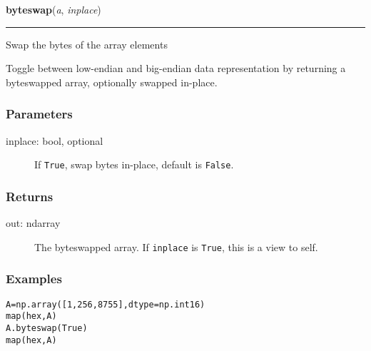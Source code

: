     \begin{boxedminipage}{\textwidth}

    \raggedright \textbf{byteswap}(\textit{a}, \textit{inplace})

    \vspace{-1.5ex}

    \rule{\textwidth}{0.5\fboxrule}

Swap the bytes of the array elements

Toggle between low-endian and big-endian data representation by
returning a byteswapped array, optionally swapped in-place.



\hypertarget{parameters}{}
\subsubsection*{Parameters}
\begin{description}
\item[{inplace: bool, optional}] %

If \texttt{True}, swap bytes in-place, default is \texttt{False}.

\end{description}



\hypertarget{returns}{}
\subsubsection*{Returns}
\begin{description}
\item[{out: ndarray}] %

The byteswapped array. If \texttt{inplace} is \texttt{True}, this is
a view to self.

\end{description}



\hypertarget{examples}{}
\subsubsection*{Examples}
\begin{alltt}
\pysrcprompt{{\textgreater}{\textgreater}{\textgreater} }A = np.array([1, 256, 8755], dtype=np.int16)
\pysrcprompt{{\textgreater}{\textgreater}{\textgreater} }map(hex, A)
\pysrcoutput{['0x1', '0x100', '0x2233']}
\pysrcoutput{}\pysrcprompt{{\textgreater}{\textgreater}{\textgreater} }A.byteswap(True)
\pysrcoutput{}\pysrcprompt{{\textgreater}{\textgreater}{\textgreater} }map(hex, A)
\pysrcoutput{['0x100', '0x1', '0x3322']}\end{alltt}


\end{boxedminipage}
